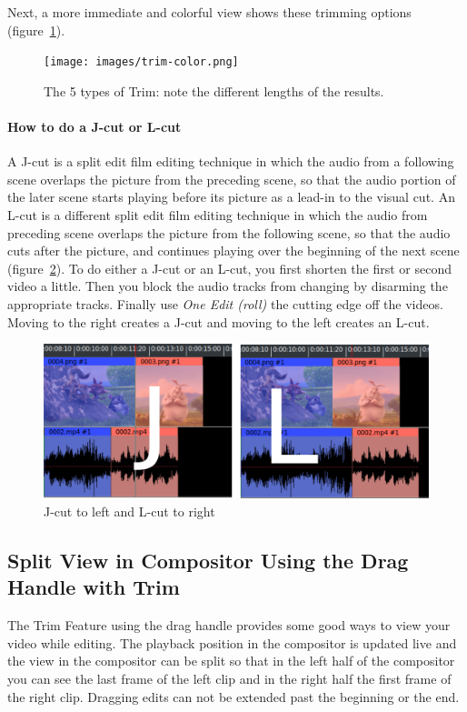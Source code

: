 Next, a more immediate and colorful view shows these trimming options (figure~\ref{fig:trim-color}).

\begin{figure}[htpb]
    \centering
    \texttt{[image: images/trim-color.png]}
    \caption{The 5 types of Trim: note the different lengths of the results.}
    \label{fig:trim-color}
\end{figure}

\paragraph{How to do a J-cut or L-cut} A J-cut is a split edit film editing technique in which the audio from a following scene overlaps the picture from the preceding scene, so that the audio portion of the later scene starts playing before its picture as a lead-in to the visual cut.  An L-cut is a different split edit film editing technique in which the audio from preceding scene overlaps the picture from the following scene, so that the audio cuts after the picture, and continues playing over the beginning of the next scene (figure~\ref{fig:j-cut}). To do either a J-cut or an L-cut, you first shorten the first or second video a little.  Then you block the audio tracks from changing by disarming the appropriate tracks.  Finally use \textit{One Edit (roll)} the cutting edge off the videos.  Moving to the right creates a J-cut and moving to the left creates an L-cut.
\begin{figure}[htpb]
    \centering
    \includegraphics[width=0.8\linewidth]{images/j-cut.png}
    \caption{J-cut to left and L-cut to right}
    \label{fig:j-cut}
\end{figure}

\subsection{Split View in Compositor Using the Drag Handle with Trim}%
\label{sub:split_view_compositor_using_drag_trim}

The Trim Feature using the drag handle provides some good ways to view your video while editing.  The playback position in the compositor is updated live and the view in the compositor can be split so that in the left half of the compositor you can see the last frame of the left clip and in the right half the first frame of the right clip.  Dragging edits can not be extended past the beginning or the end.

